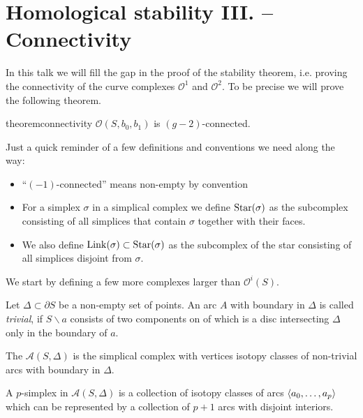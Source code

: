 \renewcommand{\setminus}{\backslash}
\section{Homological stability III. -- Connectivity}
In this talk we will fill the gap in the proof of the stability theorem, i.e. proving the connectivity of the curve complexes $\mathcal{O}^1$ and $\mathcal{O}^2$.
To be precise we will prove the following theorem.

\begin{restatable}[{name=[Connectivity]}]{theorem}{connectivity}\label{connec_main}
	$\mathcal{O}(S,b_0,b_1)$ is $(g-2)$-connected.
\end{restatable}

\begin{remark*}
	Just a quick reminder of a few definitions and conventions we need along the way:
	\begin{itemize}[itemsep=0pt]
		\item \enquote{$(-1)$-connected} means non-empty by convention
		\item For a simplex $\sigma$ in a simplical complex we define
		\(
			\Star(\sigma)
		\)
		as the subcomplex consisting of all simplices that contain $\sigma$ together with their faces.
		\item We also define $\Link(\sigma) \subset \Star(\sigma)$ as the subcomplex of the star consisting of all simplices disjoint from $\sigma$.
	\end{itemize}
\end{remark*}

We start by defining a few more complexes larger than $\mathcal{O}^i(S)$.

Let $\Delta \subset \partial S$ be a non-empty set of points.
An arc $A$ with boundary in $\Delta$ is called \emph{trivial}, if $S \setminus a$ consists of two components on of which is a disc intersecting $\Delta$ only in the boundary of $a$.

\begin{definition*}
	The  $\mathcal{A}(S,\Delta)$ is the simplical complex with vertices isotopy classes of non-trivial arcs with boundary in $\Delta$.
\end{definition*}
A $p$-simplex in $\mathcal{A}(S,\Delta)$ is a collection of isotopy classes of arcs $\angbrace*{a_0, \ldots ,a_p}$ which can be represented by a collection of $p+1$ arcs with disjoint interiors.

